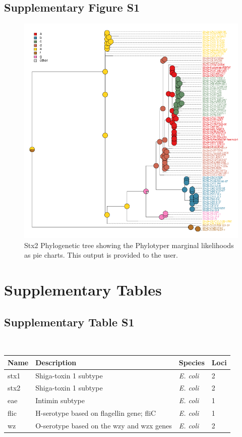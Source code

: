 \documentclass[11pt,letterpaper]{article}
\begin{document}
\subsection{Supplementary Figure S1}

\begin{figure}[h!]
\centering
\includegraphics[scale=0.5]{sfig01.png}
\caption{Stx2 Phylogenetic tree showing the Phylotyper marginal likelihoods as pie charts. This output is provided to the user.}
\end{figure}

\clearpage

\section{Supplementary Tables}

\subsection{Supplementary Table S1}

~

\begin{minipage}{\linewidth}
\centering
{}
\medskip
\begin{tabular}{@{}llll@{}}\toprule Name &
Description & Species & Loci\\\midrule
stx1 & Shiga-toxin 1 subtype & {\it E. coli} & 2 \\
stx2 & Shiga-toxin 1 subtype & {\it E. coli} & 2\\
eae & Intimin subtype & {\it E. coli} & 1\\
flic & H-serotype based on flagellin gene; fliC & {\it E. coli} & 1\\
wz & O-serotype based on the wzy and wzx genes & {\it E. coli} & 2\\\bottomrule
\end{tabular}\par

\end{minipage}
\end{document}
